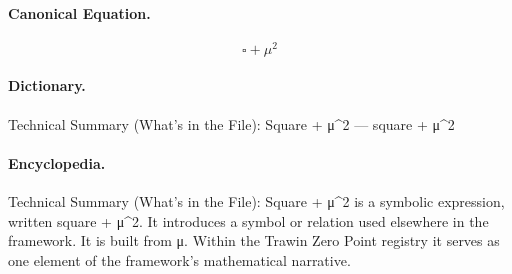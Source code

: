 \paragraph{Canonical Equation.}
\[
\square + \mu^2
\]

\paragraph{Dictionary.}
Technical Summary (What’s in the File): Square + μ\textasciicircum{}2 — square + μ\textasciicircum{}2

\paragraph{Encyclopedia.}
Technical Summary (What’s in the File): Square + μ\textasciicircum{}2 is a symbolic expression, written square + μ\textasciicircum{}2. It introduces a symbol or relation used elsewhere in the framework. It is built from μ. Within the Trawin Zero Point registry it serves as one element of the framework's mathematical narrative.
